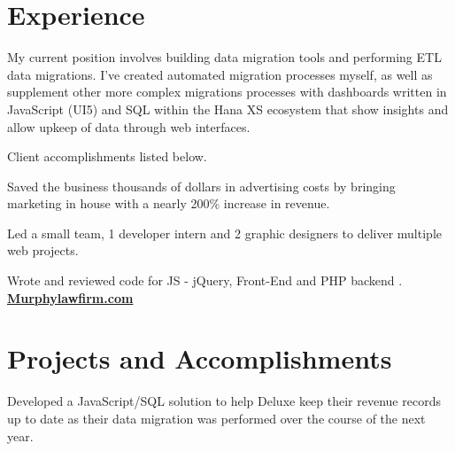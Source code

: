 \documentclass[]{deedy-resume-openfont}
\begin{document}
\hfill
\begin{minipage}[t]{0.66\textwidth} 


\section{Experience}
\vspace{\topsep} %
\vspace{\topsep} %
\begin{tightemize}
\item My current position involves building data migration tools and performing ETL data migrations. I've created automated migration processes myself, as well as supplement other more complex migrations processes with dashboards written in JavaScript (UI5) and SQL within the Hana XS ecosystem that show insights and allow upkeep of data through web interfaces.

\item Client accomplishments listed below.
\end{tightemize}
\sectionsep

\vspace{\topsep} %
\begin{tightemize}
\item Saved the business thousands of dollars in advertising costs by bringing marketing in house with a nearly 200\% increase in revenue.
\item Led a small team, 1 developer intern and 2 graphic designers to deliver multiple web projects.
\item Wrote and reviewed code for JS - jQuery, Front-End and PHP backend .
\href{https://murphylawfirm.com}{\bf Murphylawfirm.com}
\end{tightemize}
\sectionsep



\section{Projects and Accomplishments}
Developed a JavaScript/SQL solution to help Deluxe keep their revenue records up to date as their data migration was performed over the course of the next year.
\sectionsep


\end{minipage}
\end{document}

